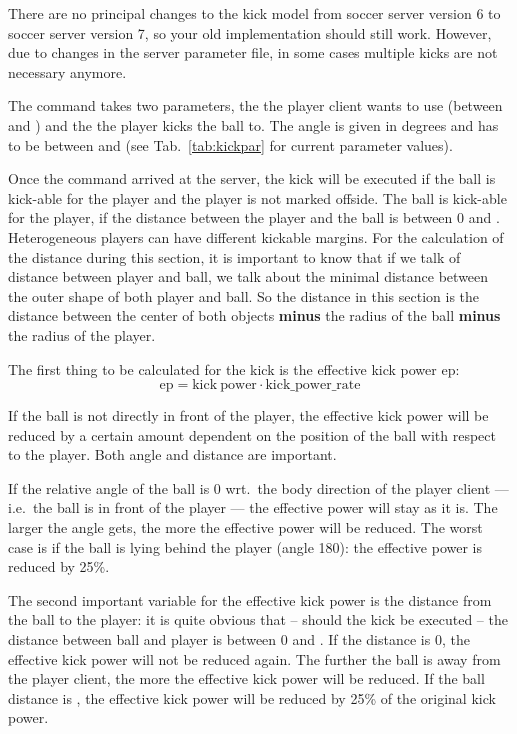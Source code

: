 There are no principal changes to the kick model from soccer server
version 6 to soccer server version 7, so your old implementation
should still work. However, due to changes in the server parameter
file, in some cases multiple kicks are not necessary anymore. 

The  command takes two parameters, the  the player client wants to use (between  and
) and the  the player kicks the ball to.
The angle is given in degrees and has to be between 
and  (see Tab.~\ref{tab:kickpar} for current
parameter values).

Once the
 command arrived at the server, the kick will be
executed if the ball is kick-able for the player and the player is not
marked offside.  The ball is kick-able for the player, if the distance
between the player and the ball is between $0$ and
. Heterogeneous players can have different
kickable margins. For the calculation of the distance during
this section, it is important to know that if we talk of distance 
between player and ball, we talk about the minimal distance between
the outer shape of both player and ball. So the distance in this
section is the distance between the center of both objects
\textbf{minus} the radius of the ball \textbf{minus} the radius of the
player.

The first thing to be calculated for the kick is the effective kick
power ep:
\begin{equation}
  \label{eq:effectivekick1}
  \mathrm{ep} = \mathrm{kick\ power} \cdot \mathrm{kick\_power\_rate}
\end{equation}

If the ball is not directly in front of the player, the effective kick
power will be reduced by a certain amount dependent on the position of
the ball with respect to the player. Both angle and distance are
important.

If the relative angle of the ball is 0{\textdegree} wrt.\ the body
direction of the player client --- i.e.\ the ball is in front of the
player --- the effective power will stay as it is. The larger the angle
gets, the more the effective power will be reduced. The worst case is
if the ball is lying behind the player (angle 180{\textdegree}): the
effective power is reduced by 25\%.

The second important variable for the effective kick power is the
distance from the ball to the player: it is quite obvious that --
should the kick be executed -- the distance between ball and player is
between $0$ and . If the distance is 0, the
effective kick power will not be reduced again. The further the ball
is away from the player client, the more the effective kick power will
be reduced. If the ball distance is , the
effective kick power will be reduced by 25\% of the original kick
power.

